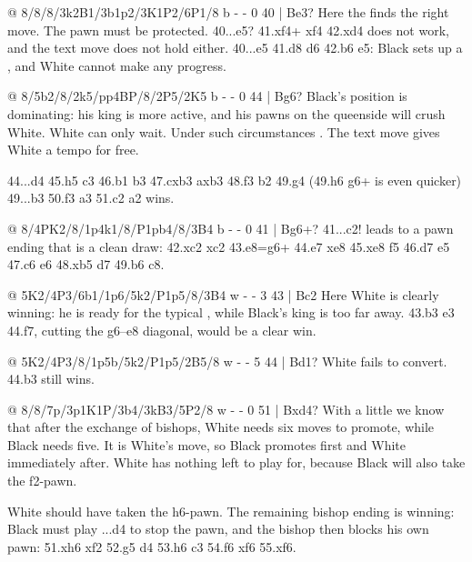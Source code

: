 @ 8/8/8/3k2B1/3b1p2/3K1P2/6P1/8 b - - 0 40 | Be3?
Here the  finds the
right move. The pawn must be protected. 40...\K e5? 41.\B xf4+ \K xf4 42.\K xd4 does not work, and
the text move does not hold either. 40...\B e5 41.\B d8 \B d6 42.\B b6 \B e5: Black sets up a
, and White cannot make any progress.

@ 8/5b2/8/2k5/pp4BP/8/2P5/2K5 b - - 0 44 | Bg6?
Black's position is dominating: his king is more active, and his pawns on the queenside will crush
White. White can only wait. Under such circumstances . The text move gives White a tempo for free.

44...\K d4 45.h5 \K c3 46.\K b1 b3 47.cxb3 axb3 48.\B f3 b2 49.\B g4 (49.h6 \B g6+ is even
quicker) 49...\K b3 50.\B f3 \K a3 51.\K c2 \B a2 wins.

@ 8/4PK2/8/1p4k1/8/P1pb4/8/3B4 b - - 0 41 | Bg6+?
41...c2! leads to a pawn ending that is a clean draw:
42.\B xc2 \B xc2 43.e8=\Q \B g6+ 44.\K e7 \B xe8 45.\K xe8 \K f5 46.\K d7 \K e5 47.\K c6 \K e6
48.\K xb5 \K d7 49.\K b6 \K c8.

@ 5K2/4P3/6b1/1p6/5k2/P1p5/8/3B4 w - - 3 43 | Bc2
Here White is clearly winning: he is ready for the typical , while Black's king is
too far away. 43.\B b3 \K e3 44.\B f7, cutting the g6--e8 diagonal,
would be a clear win.

@ 5K2/4P3/8/1p5b/5k2/P1p5/2B5/8 w - - 5 44 | Bd1?
White fails to convert. 44.\B b3 still wins.

@ 8/8/7p/3p1K1P/3b4/3kB3/5P2/8 w - - 0 51 | Bxd4?
With a little  we know that after the exchange of bishops,
White needs six moves to promote, while Black needs five. It is White's move, so Black promotes
first and White immediately after. White has nothing left to play for, because Black will also
take the f2-pawn.

White should have taken the h6-pawn. The remaining bishop ending is winning: Black must play
...\B d4 to stop the pawn, and the bishop then blocks his own pawn: 51.\B xh6 \B xf2 52.\B g5
\B d4 53.h6 \B c3 54.\B f6 \B xf6 55.\K xf6.

